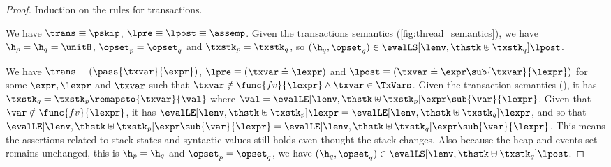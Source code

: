 \begin{proof}
Induction on the rules for transactions.


We have  \(\trans \equiv \pskip\), \( \lpre \equiv \lpost \equiv \assemp \).
Given the transactions semantics (\fig \ref{fig:thread_semantics}), we have \( \h_{p} = \h_{q} = \unitH \), \( \opset_{p} = \opset_{q} \) and \( \txstk_{p} = \txstk_{q} \), so \( (\h_{q},\opset_{q} ) \in \evalLS[\lenv, \thstk \uplus \txstk_{q}]{\lpost} \).


We have \(\trans \equiv ( \pass{\txvar}{\expr} ) \), \( \lpre \equiv ( \txvar \doteq \lexpr ) \) and \( \lpost \equiv ( \txvar \doteq \expr\sub{\txvar}{\lexpr} ) \) for some \( \expr, \lexpr \) and \( \txvar \) such that \( \txvar \notin \func{fv}{\lexpr} \land \txvar \in \TxVars\).
Given the transaction semantics (), it has \( \txstk_{q} = \txstk_{p}\remapsto{\txvar}{\val} \) where \( \val = \evalLE[\lenv, \thstk \uplus \txstk_{p}]{\expr\sub{\var}{\lexpr}} \).
Given that \( \var \notin \func{fv}{\lexpr} \), it has \( \evalLE[\lenv, \thstk \uplus \txstk_{p}]{\lexpr} = \evalLE[\lenv, \thstk \uplus \txstk_{q}]{\lexpr} \), and so that \( \evalLE[\lenv, \thstk \uplus \txstk_{p}]{\expr\sub{\var}{\lexpr}} = \evalLE[\lenv, \thstk \uplus \txstk_{q}]{\expr\sub{\var}{\lexpr}} \).
This means the assertions related to stack states and syntactic values still holds even thought the stack changes.
Also because the heap and events set remains unchanged, this is \( \h_{p} = \h_{q} \) and \( \opset_{p} = \opset_{q} \), we have \( (\h_{q}, \opset_{q} ) \in \evalLS[\lenv, \thstk \uplus \txstk_{q}]{\lpost} \).



\end{proof}
